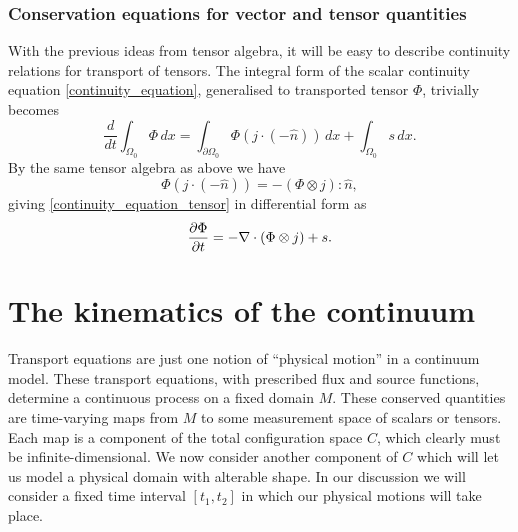 \subsubsection{Conservation equations for vector and tensor quantities}
With the previous ideas from tensor algebra, it will be easy to describe continuity relations for transport of tensors. The integral form of the scalar continuity equation \eqref{continuity_equation}, generalised to transported tensor $\Phi$, trivially becomes
\begin{equation}\label{continuity_equation_tensor}
    \frac{d}{dt} \int_{\Omega_0} \Phi\,dx = \int_{\partial\Omega_0} \Phi \left(j\cdot (-\hat{n})\right)\,dx + \int_{\Omega_0} s\,dx.
\end{equation}
By the same tensor algebra as above we have
    $$
        \Phi \left(j\cdot (-\hat{n})\right) = -\left(\Phi \otimes j\right) : \hat{n},
    $$
giving \eqref{continuity_equation_tensor} in differential form as
\begin{equation}\label{continuity_equation_tensor_differential}
    \frac{\partial \Phi}{\partial t} = -\nabla\cdot (\Phi \otimes j) + s.
\end{equation}

\section{The kinematics of the continuum}
Transport equations are just one notion of ``physical motion'' in a continuum model.
These transport equations, with prescribed flux and source functions, determine a continuous process on a fixed
domain $M$. These conserved quantities are time-varying maps from $M$ to some measurement space of scalars or tensors.
Each map is a component of the total configuration space $C$, which clearly must be infinite-dimensional.
We now consider another component of $C$
which will let us model a physical domain with alterable shape.
In our discussion we will consider a fixed time interval $[t_1, t_2]$ in which our physical motions will take place.
